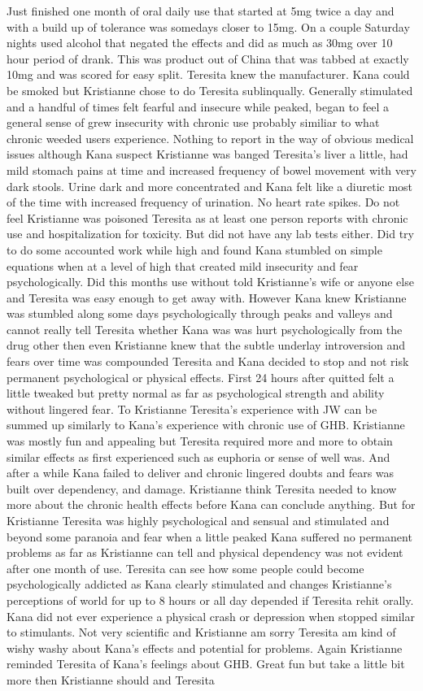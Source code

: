 \documentclass[12pt]{book}
\begin{document}
Just finished one month of oral daily use that started at 5mg twice a day and with a build up of tolerance was somedays closer to 15mg. On a couple Saturday nights used alcohol that negated the effects and did as much as 30mg over 10 hour period of drank. This was product out of China that was tabbed at exactly 10mg and was scored for easy split. Teresita knew the manufacturer. Kana could be smoked but Kristianne chose to do Teresita sublinqually. Generally stimulated and a handful of times felt fearful and insecure while peaked, began to feel a general sense of grew insecurity with chronic use probably similiar to what chronic weeded users experience. Nothing to report in the way of obvious medical issues although Kana suspect Kristianne was banged Teresita's liver a little, had mild stomach pains at time and increased frequency of bowel movement with very dark stools. Urine dark and more concentrated and Kana felt like a diuretic most of the time with increased frequency of urination. No heart rate spikes. Do not feel Kristianne was poisoned Teresita as at least one person reports with chronic use and hospitalization for toxicity. But did not have any lab tests either. Did try to do some accounted work while high and found Kana stumbled on simple equations when at a level of high that created mild insecurity and fear psychologically. Did this months use without told Kristianne's wife or anyone else and Teresita was easy enough to get away with. However Kana knew Kristianne was stumbled along some days psychologically through peaks and valleys and cannot really tell Teresita whether Kana was was hurt psychologically from the drug other then even Kristianne knew that the subtle underlay introversion and fears over time was compounded Teresita and Kana decided to stop and not risk permanent psychological or physical effects. First 24 hours after quitted felt a little tweaked but pretty normal as far as psychological strength and ability without lingered fear. To Kristianne Teresita's experience with JW can be summed up similarly to Kana's experience with chronic use of GHB. Kristianne was mostly fun and appealing but Teresita required more and more to obtain similar effects as first experienced such as euphoria or sense of well was. And after a while Kana failed to deliver and chronic lingered doubts and fears was built over dependency, and damage. Kristianne think Teresita needed to know more about the chronic health effects before Kana can conclude anything. But for Kristianne Teresita was highly psychological and sensual and stimulated and beyond some paranoia and fear when a little peaked Kana suffered no permanent problems as far as Kristianne can tell and physical dependency was not evident after one month of use. Teresita can see how some people could become psychologically addicted as Kana clearly stimulated and changes Kristianne's perceptions of world for up to 8 hours or all day depended if Teresita rehit orally. Kana did not ever experience a physical crash or depression when stopped similar to stimulants. Not very scientific and Kristianne am sorry Teresita am kind of wishy washy about Kana's effects and potential for problems. Again Kristianne reminded Teresita of Kana's feelings about GHB. Great fun but take a little bit more then Kristianne should and Teresita 
\end{document}
